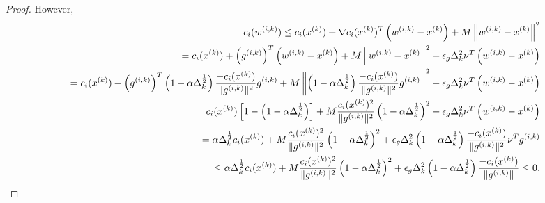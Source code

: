 \begin{proof}


However,
\begin{align*}
c_i({w^{(i, k)}})  \le c_i({x^{(k)}}) + \nabla c_i({x^{(k)}})^T\left({w^{(i, k)}} - {x^{(k)}} \right) + M \left\|{w^{(i, k)}} - {x^{(k)}}\right\|^2 \\
= c_i({x^{(k)}}) + \left({g^{(i, k)}}\right)^T\left({w^{(i, k)}} - {x^{(k)}}\right)+ M \left\|{w^{(i, k)}} - {x^{(k)}}\right\|^2  + \epsilon_g \Delta_k^2\nu^T \left({w^{(i, k)}} - {x^{(k)}}\right) \\
= c_i({x^{(k)}}) + \left({g^{(i, k)}}\right)^T\left(1 - \alpha \Delta_k^{\frac 1 2 }\right)\frac{-c_i({x^{(k)}})}{\|{g^{(i, k)}}\|^2}{g^{(i, k)}} + M \left\|\left(1 - \alpha \Delta_k^{\frac 1 2 }\right)\frac{-c_i({x^{(k)}})}{\|{g^{(i, k)}}\|^2}{g^{(i, k)}}\right\|^2  + \epsilon_g \Delta_k^2\nu^T \left({w^{(i, k)}} - {x^{(k)}}\right) \\
= c_i({x^{(k)}})\left[1 - \left(1 - \alpha \Delta_k^{\frac 1 2 }\right)\right] + M \frac {c_i({x^{(k)}})^2}{\|{g^{(i, k)}}\|^2}\left(1 - \alpha \Delta_k^{\frac 1 2 }\right)^2 + \epsilon_g \Delta_k^2\nu^T \left({w^{(i, k)}} - {x^{(k)}}\right) \\
= \alpha \Delta_k^{\frac 1 2 } c_i({x^{(k)}}) + M \frac {c_i({x^{(k)}})^2}{\|{g^{(i, k)}}\|^2}\left(1 - \alpha \Delta_k^{\frac 1 2 }\right)^2 + \epsilon_g \Delta_k^2 \left(1 - \alpha \Delta_k^{\frac 1 2 }\right)\frac{-c_i({x^{(k)}})}{\|{g^{(i, k)}}\|^2}\nu^T{g^{(i, k)}} \\
\le \alpha \Delta_k^{\frac 1 2 } c_i({x^{(k)}}) + M \frac {c_i({x^{(k)}})^2}{\|{g^{(i, k)}}\|^2}\left(1 - \alpha \Delta_k^{\frac 1 2 }\right)^2 + \epsilon_g \Delta_k^2 \left(1 - \alpha \Delta_k^{\frac 1 2 }\right)\frac{-c_i({x^{(k)}})}{\|{g^{(i, k)}}\|} \le 0.
\end{align*}


% 
% 



\end{proof}
